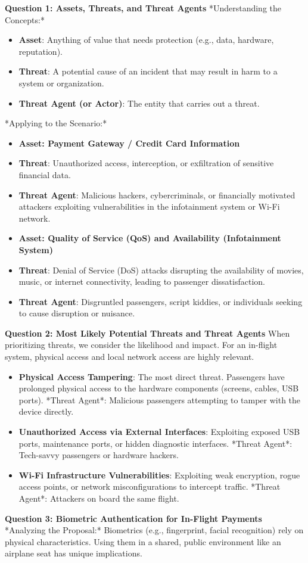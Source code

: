 \documentclass{article}
\begin{document}
\textbf{Question 1: Assets, Threats, and Threat Agents}
*Understanding the Concepts:*
\begin{itemize}
    \item \textbf{Asset}: Anything of value that needs protection (e.g., data, hardware, reputation).
    \item \textbf{Threat}: A potential cause of an incident that may result in harm to a system or organization.
    \item \textbf{Threat Agent (or Actor)}: The entity that carries out a threat.

\end{itemize}
*Applying to the Scenario:*
\begin{itemize}
    \item[\textbf{1.}] \textbf{Asset: Payment Gateway / Credit Card Information}
    \item \textbf{Threat}: Unauthorized access, interception, or exfiltration of sensitive financial data.
    \item \textbf{Threat Agent}: Malicious hackers, cybercriminals, or financially motivated attackers exploiting vulnerabilities in the infotainment system or Wi-Fi network.
    \item[\textbf{2.}] \textbf{Asset: Quality of Service (QoS) and Availability (Infotainment System)}
    \item \textbf{Threat}: Denial of Service (DoS) attacks disrupting the availability of movies, music, or internet connectivity, leading to passenger dissatisfaction.
    \item \textbf{Threat Agent}: Disgruntled passengers, script kiddies, or individuals seeking to cause disruption or nuisance.

\end{itemize}
\textbf{Question 2: Most Likely Potential Threats and Threat Agents}
When prioritizing threats, we consider the likelihood and impact. For an in-flight system, physical access and local network access are highly relevant.
\begin{itemize}
    \item[\textbf{1.}] \textbf{Physical Access Tampering}: The most direct threat. Passengers have prolonged physical access to the hardware components (screens, cables, USB ports). *Threat Agent*: Malicious passengers attempting to tamper with the device directly.
    \item[\textbf{2.}] \textbf{Unauthorized Access via External Interfaces}: Exploiting exposed USB ports, maintenance ports, or hidden diagnostic interfaces. *Threat Agent*: Tech-savvy passengers or hardware hackers.
    \item[\textbf{3.}] \textbf{Wi-Fi Infrastructure Vulnerabilities}: Exploiting weak encryption, rogue access points, or network misconfigurations to intercept traffic. *Threat Agent*: Attackers on board the same flight.

\end{itemize}
\textbf{Question 3: Biometric Authentication for In-Flight Payments}
*Analyzing the Proposal:*
Biometrics (e.g., fingerprint, facial recognition) rely on physical characteristics. Using them in a shared, public environment like an airplane seat has unique implications.
\end{document}
